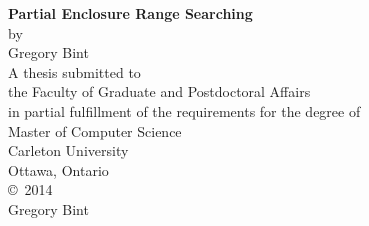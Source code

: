 \documentclass[12pt,letterpaper]{report}
\theoremstyle{definition}
\begin{document}
\begin{titlepage}
   \begin{center}
      \vspace*{\fill}
      \large
      {\bf \LARGE Partial Enclosure Range Searching}\\
      \vspace{0.25in}
      by\\
      \vspace{0.25in}
      Gregory Bint\\
      \vspace{0.5in}
      A thesis submitted to\\
      the Faculty of Graduate and Postdoctoral Affairs\\
      in partial fulfillment of the requirements for the degree of\\
      \vspace{0.5in}
      Master of Computer Science\\
      \vspace{1.2in}
      Carleton University\\
      Ottawa, Ontario\\
      \vspace{0.5in}
      \copyright\ 2014\\
      Gregory Bint
      \vspace*{\fill}
   \end{center}
\end{titlepage}
\doublespacing
{}
\setcounter{page}{2}


\tableofcontents
\listoffigures
\listofalgorithms
\newpage
\pagestyle{fancy}
\setcounter{page}{1}







\cleardoublepage
{}


\end{document}
